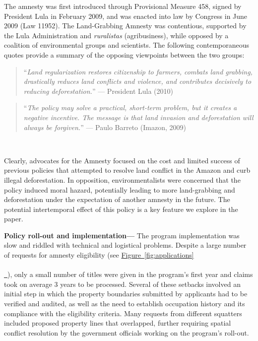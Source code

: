 \documentclass[12pt]{article}
\newcommand*{\figref}[2][]{%
  \hyperref[{fig:#2}]{%
    Figure~\ref*{fig:#2}%
    \ifx\\#1\\%
    \else
      \,#1%
    \fi
  }%
}
\begin{document}
\quad The amnesty was first introduced through Provisional Measure 458, signed by President Lula in February 2009, and was enacted into law by Congress in June 2009 (Law 11952). The Land-Grabbing Amnesty was contentious, supported by the Lula Administration and \textit{ruralistas} (agribusiness), while opposed by a coalition of environmental groups and scientists. The following contemporaneous quotes provide a summary of the opposing viewpoints between the two groups: 
\begin{quote}
  ``\textit{Land regularization restores citizenship to farmers, combats land grabbing, drastically reduces land
conflicts and violence, and contributes decisively to reducing deforestation.}'' --- President Lula (2010) 
\end{quote}
\begin{quote}
``\textit{The policy may solve a practical, short-term problem, but it creates a negative incentive. The message
is that land invasion and deforestation will always be forgiven.}'' \quad\quad \quad \quad \quad \quad  --- Paulo Barreto (Imazon, 2009)
\end{quote}
\ 

\quad Clearly, advocates for the Amnesty focused on the cost and limited success of previous policies that attempted to resolve land conflict in the Amazon and curb illegal deforestation. In opposition, environmentalists were concerned that the policy induced moral hazard, potentially leading to more land-grabbing and deforestation under the expectation of another amnesty in the future. The potential intertemporal effect of this policy is a key feature we explore in the paper. 
\ 

\quad \textbf{Policy roll-out and implementation---} The program implementation was slow and riddled with technical and logistical problems. Despite a large number of requests for amnesty eligibility (see \figref{applications}), only a small number of titles were given in the program's first year and claims took on average 3 years to be processed. Several of these setbacks involved an initial step in which the property boundaries submitted by applicants had to be verified and audited, as well as the need to establish occupation history and its compliance with the eligibility criteria. Many requests from different squatters included proposed property lines that overlapped, further requiring spatial conflict resolution by the government officials working on the program's roll-out. 
\ 
\end{document}
